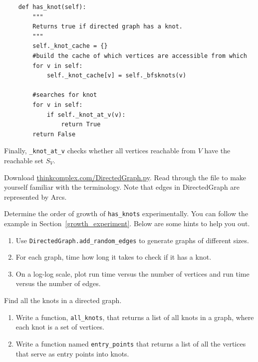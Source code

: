 \documentclass[10pt]{book}
\begin{document}
\begin{verbatim}
    def has_knot(self):
        """
        Returns true if directed graph has a knot.
        """
        self._knot_cache = {}
        #build the cache of which vertices are accessible from which
        for v in self:
            self._knot_cache[v] = self._bfsknots(v)

        #searches for knot
        for v in self:
            if self._knot_at_v(v):
                return True
        return False
\end{verbatim}

Finally, \verb"_knot_at_v" checks whether all vertices reachable
from $V$ have the reachable set $S_V$.

\begin{exercise}

Download \url{thinkcomplex.com/DirectedGraph.py}.
Read through the file to make yourself familiar with
the terminology. Note that edges in DirectedGraph are represented by
Arcs.

Determine the order of growth of \verb"has_knots" experimentally. You
can follow the example in Section~\ref{growth_experiment}. Below are
some hints to help you out.

\begin{enumerate}

 \item Use \verb"DirectedGraph.add_random_edges" to generate graphs of
   different sizes.

\item For each graph, time how long it takes to check if it has a knot.

\item On a log-log scale, plot run time versus
  the number of vertices and run time versus the number of edges.

\end{enumerate}

\end{exercise}

\begin{exercise}
Find all the knots in a directed graph.

\begin{enumerate}
 \item Write a function, \verb"all_knots", that returns a list of all
   knots in a graph, where each knot is a set of vertices.

\item Write a function named \verb"entry_points" that returns a list
  of all the vertices that serve as entry points into knots.

\end{enumerate}

\end{exercise}
\end{document}
